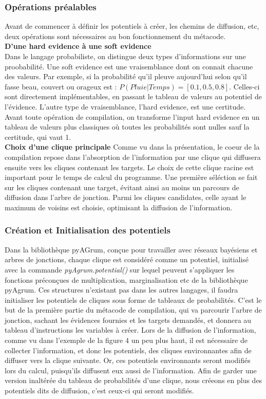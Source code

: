 \documentclass[a4paper]{article}
\begin{document}
    \subsubsection{Opérations préalables}
Avant de commencer à définir les potentiels à créer, les chemins de diffusion, etc, deux opérations sont nécessaires au bon fonctionnement du métacode.\\
\textbf{D'une hard evidence à une soft evidence}\\
Dans le langage probabiliste, on distingue deux types d'informations sur une proobabilité. Une soft evidence est une vraisemblance dont on connait chacune des valeurs. Par exemple, si la probabilité
qu'il pleuve aujourd'hui selon qu'il fasse beau, couvert ou orageux est : $P(Pluie|Temps) = [ 0.1, 0.5, 0.8 ]$. Celles-ci sont directement implémentables, en passant le tableau de 
valeurs au potentiel de l'évidence. L'autre type de vraisemblance, l'hard evidence, est une certitude. Avant toute opération de compilation, on transforme l'input hard evidence en un tableau de valeurs
plus classiques où toutes les probabilités sont nulles sauf la certitude, qui vaut 1.
\\
\textbf{Choix d'une clique principale}
Comme vu dans la présentation, le coeur de la compilation repose dans l'absorption de l'information par une clique qui diffusera ensuite vers les cliques contenant les targets. Le choix de cette
clique racine est important pour le temps de calcul du programme. Une première séléction se fait sur les cliques contenant une target, évitant ainsi au moins un parcours de diffusion dans l'arbre de 
jonction. Parmi les cliques candidates, celle ayant le maximum de voisins est choisie, optimisant la diffusion de l'information.\\
  \subsubsection{Création et Initialisation des potentiels}
Dans la bibliothèque pyAGrum, conçue pour travailler avec réseaux bayésiens et arbres de jonctions, chaque clique est considéré comme un potentiel, initialisé avec la commande \textit{pyAgrum.potential()}
sur lequel peuvent s'appliquer les fonctions préconçues de multiplication, marginalisation etc de la bibliothèque pyAgrum. Ces structures n'existant pas dans les autres langages, il faudra initialiser
les potentiels de cliques sous forme de tableaux de probabilités. C'est le but de la première partie du métacode de compilation, qui va parcourir l'arbre de jonction, sachant les évidences fournies et 
les targets demandés, et donnera au tableau d'instructions les variables à créer. Lors de la diffusion de l'information, comme vu dans l'exemple de la figure 4 un peu plus haut, il est nécessaire de collecter
l'information, et donc les potentiels, des cliques environnantes afin de diffuser vers la clique suivante. Or, ces potentiels environnants seront modifiés lors du calcul, puisqu'ils diffusent eux aussi de l'information.
Afin de garder une version inaltérée du tableau de probabilités d'une clique, nous créeons en plus des potentiels dits de diffusion, c'est ceux-ci qui seront modifiés.
\end{document}
